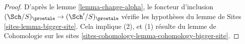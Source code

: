 \begin{proof}
D'après le lemme \ref{lemma-change-alpha}, le foncteur d'inclusion
$(\Sch/S)_\proetale \to (\Sch'/S)_\proetale$ vérifie les hypothèses du
lemme de Sites \ref{sites-lemma-bigger-site}. Cela implique (2), et (1)
résulte du
lemme de Cohomologie sur les sites \ref{sites-cohomology-lemma-cohomology-bigger-site}.
\end{proof}
















